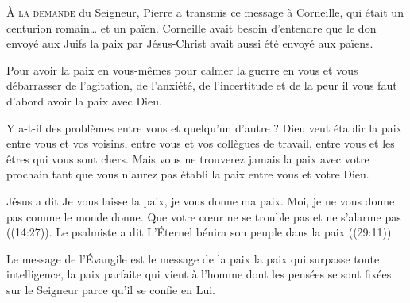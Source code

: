 





\lettrine{À}{ la demande} du Seigneur, Pierre a transmis ce message à Corneille,
 qui était un centurion romain\dots{} et un païen.
 Corneille avait besoin d'entendre que le don envoyé aux Juifs
 \ocadr la paix par Jésus-Christ \fcadr{} avait aussi été envoyé aux païens.

Pour avoir la paix en vous-mêmes \ocadr pour calmer la guerre en vous
 et vous débarrasser de l'agitation, de l'anxiété, de l'incertitude
 et de la peur \fcadr{} il vous faut d'abord avoir la paix avec Dieu.


Y a-t-il des problèmes entre vous et quelqu'un d'autre ?
 Dieu veut établir la paix entre vous et vos voisins,
 entre vous et vos collègues de travail,
 entre vous et les êtres qui vous sont chers.
 Mais vous ne trouverez jamais la paix avec votre prochain
 tant que vous n'aurez pas établi la paix entre vous et votre Dieu.

Jésus a dit\frcolon{} 
 \Og Je vous laisse la paix, je vous donne ma paix.
 Moi, je ne vous donne pas comme le monde donne.
 Que votre c\oe{}ur ne se trouble pas et ne s'alarme pas \Fg{}
 ((14:27)).
 Le psalmiste a dit\frcolon{} 
 \Og L'Éternel bénira son peuple dans la paix \Fg{}
 ((29:11)).

Le message de l'Évangile est le message de la paix
 \ocadr la paix qui surpasse toute intelligence,
 la paix parfaite qui vient à l'homme dont les pensées
 se sont fixées sur le Seigneur parce qu'il se confie en Lui.

\dvrule



